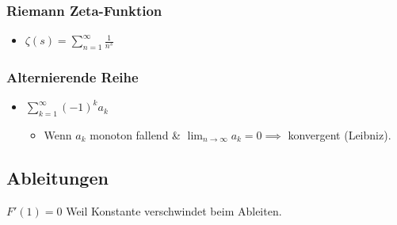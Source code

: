\documentclass[a4paper]{article}
\def\limn{\lim_{n\to \infty}}
\begin{document}
\subsubsection{Riemann Zeta-Funktion}
\begin{itemize}[leftmargin=4.5mm, topsep=1pt, parsep=1pt]
\item $\zeta(s) = \sum_{n=1}^\infty \frac{1}{n^s}$ \qquad
\end{itemize}

\subsubsection{Alternierende Reihe}
\begin{itemize}[leftmargin=4.5mm, topsep=1pt, parsep=1pt]
  \item $\sum_{k = 1}^{\infty} (-1)^k a_k$  \\
    \begin{itemize}[leftmargin=4.5mm, topsep=1pt, parsep=1pt]
      \item Wenn $a_k$ monoton fallend \& $\limn a_k = 0 \implies$ konvergent (Leibniz).
    \end{itemize}      
\end{itemize}

\subsection{Ableitungen}
$F'(1) = 0$ Weil Konstante verschwindet beim Ableiten. \\ 
\end{document}
